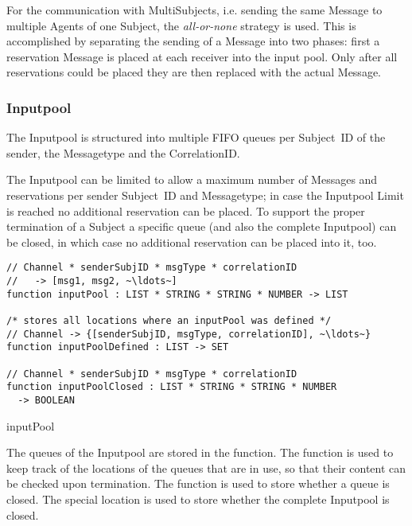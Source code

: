 For the communication with MultiSubjects, i.e. sending the same Message to
multiple Agents of one Subject, the \textit{all-or-none} strategy is used. This
is accomplished by separating the sending of a Message into two phases: first
a reservation Message is placed at each receiver into the input pool.
Only after all reservations could be placed they are then replaced with the
actual Message.

\subsubsection{Inputpool}\label{sec:Inputpool}

The Inputpool is structured into multiple FIFO queues per Subject~ID of the sender, the Messagetype and the CorrelationID.

The Inputpool can be limited to allow a maximum number of Messages and
reservations per sender Subject~ID and Messagetype; in case the Inputpool Limit is
reached no additional reservation can be placed. To support the proper
termination of a Subject a specific queue (and also the complete Inputpool)
can be closed, in which case no additional reservation can be placed into it,
too.

\begin{listing}[htbp]
\begin{verbatim}
// Channel * senderSubjID * msgType * correlationID
//   -> [msg1, msg2, ~\ldots~]
function inputPool : LIST * STRING * STRING * NUMBER -> LIST

/* stores all locations where an inputPool was defined */
// Channel -> {[senderSubjID, msgType, correlationID], ~\ldots~}
function inputPoolDefined : LIST -> SET

// Channel * senderSubjID * msgType * correlationID
function inputPoolClosed : LIST * STRING * STRING * NUMBER
  -> BOOLEAN
\end{verbatim}
\caption{inputPool}
\label{lst:shortasm:inputPool}
\end{listing}


The queues of the Inputpool are stored in the  function.
The function  is used to keep track of the
locations of the queues that are in use, so that their content can be checked
upon termination. The function  is used to store
whether a queue is closed. The special location
 is used to
store whether the complete Inputpool is closed.

